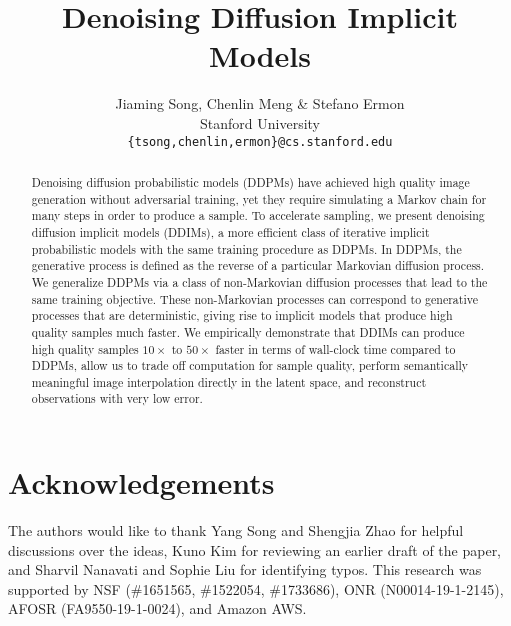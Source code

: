 \documentclass{article} %
\title{Denoising Diffusion Implicit Models}
\author{Jiaming Song, Chenlin Meng \& Stefano Ermon\\
Stanford University\\
\texttt{\{tsong,chenlin,ermon\}@cs.stanford.edu}}
\begin{document}
\maketitle

\begin{abstract}
Denoising diffusion probabilistic models (DDPMs) have achieved high quality image generation without adversarial training, yet they require simulating a Markov chain for many steps in order to produce a sample. To accelerate sampling, we present denoising diffusion implicit models (DDIMs), a more efficient class of iterative implicit probabilistic models with the same training procedure as DDPMs. In DDPMs, the generative process is defined as the reverse of a particular Markovian diffusion process. We generalize DDPMs via a class of non-Markovian diffusion processes that lead to the same training objective. These non-Markovian processes can correspond to generative processes that are deterministic, giving rise to implicit models that produce high quality samples much faster. We empirically demonstrate that DDIMs can produce high quality samples $10 \times$ to $50 \times$ faster in terms of wall-clock time compared to DDPMs, allow us to trade off computation for sample quality, perform semantically meaningful image interpolation directly in the latent space, and reconstruct observations with very low error. 
\end{abstract}








\section*{Acknowledgements}
The authors would like to thank Yang Song and Shengjia Zhao for helpful discussions over the ideas, Kuno Kim for reviewing an earlier draft of the paper, and Sharvil Nanavati and Sophie Liu for identifying typos. This research was supported by NSF (\#1651565, \#1522054, \#1733686), ONR (N00014-19-1-2145), AFOSR (FA9550-19-1-0024), and Amazon AWS.






\end{document}
